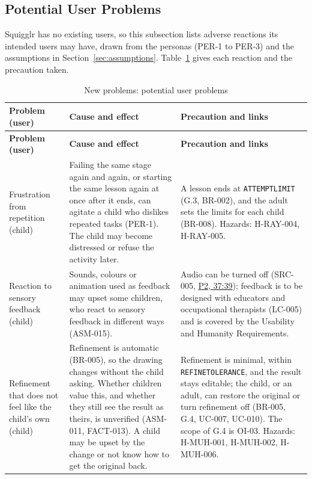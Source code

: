 \documentclass[12pt]{article}
\renewcommand{\_}{\textunderscore\allowbreak}%
\newcommand{\intlink}[3]{\hyperref[int:#1-#2]{#3}}
\newcommand{\intref}[2]{\intlink{#1}{#2}{#1, #2}}
\begin{document}
\subsection{Potential User Problems}
Squigglr has no existing users, so this subsection lists adverse reactions its
intended users may have, drawn from the personas (PER-1 to PER-3) and the
assumptions in Section~\ref{sec:assumptions}. Table~\ref{tab:new-problems-users}
gives each reaction and the precaution taken.

{\small
\begin{longtable}{@{}>{\raggedright\arraybackslash}p{}%
>{\raggedright\arraybackslash}p{}%
>{\raggedright\arraybackslash}p{}@{}}
\caption{New problems: potential user problems}
\label{tab:new-problems-users}\\
\toprule
\textbf{Problem (user)} & \textbf{Cause and effect} & \textbf{Precaution and
links} \\
\midrule
\endfirsthead
\toprule
\textbf{Problem (user)} & \textbf{Cause and effect} & \textbf{Precaution and
links} \\
\midrule
\endhead
\bottomrule
\endlastfoot
Frustration from repetition (child) & Failing the same stage again and again, or
starting the same lesson again at once after it ends, can agitate a child who dislikes
repeated tasks (PER-1). The child may become distressed or refuse the activity
later. & A lesson ends at \texttt{ATTEMPT\_LIMIT} (G.3, BR-002), and the adult
sets the limits for each child (BR-008). Hazards: H-RAY-004, H-RAY-005. \\
\addlinespace
Reaction to sensory feedback (child) & Sounds, colours or animation used as
feedback may upset some children, who react to sensory feedback in different
ways (ASM-015). & Audio can be turned off (SRC-005, \intref{P2}{37:39});
feedback is to be designed with educators and occupational therapists (LC-005)
and is covered by the Usability and Humanity Requirements. \\
\addlinespace
Refinement that does not feel like the child's own (child) & Refinement is
automatic (BR-005), so the drawing changes without the child asking. Whether
children value this, and whether they still see the result as theirs, is
unverified (ASM-011, FACT-013). A child may be upset by the change or not know
how to get the original back. & Refinement is minimal, within
\texttt{REFINE\_TOLERANCE}, and the result stays editable; the child, or an
adult, can restore the original or turn refinement off (BR-005, G.4, UC-007,
UC-010). The scope of G.4 is OI-03. Hazards: H-MUH-001, H-MUH-002, H-MUH-006. \\

\end{longtable}}
\end{document}
